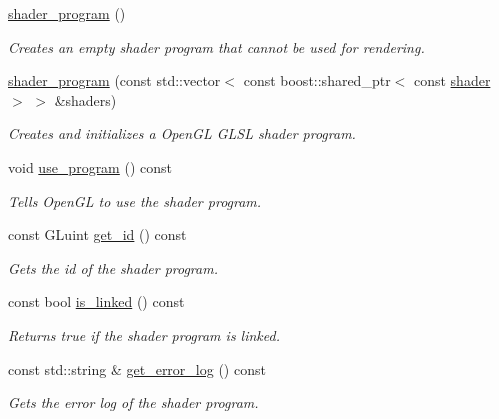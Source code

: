 \begin{DoxyCompactItemize}
\item 
\hyperlink{classoccluded_1_1opengl_1_1retained_1_1shaders_1_1shader__program_a940103083cf5b991c8de690748311dc3}{shader\+\_\+program} ()
\begin{DoxyCompactList}\small\item\em Creates an empty shader program that cannot be used for rendering. \end{DoxyCompactList}\item 
\hyperlink{classoccluded_1_1opengl_1_1retained_1_1shaders_1_1shader__program_ac6459ada0453594a47d1294591d26fc5}{shader\+\_\+program} (const std\+::vector$<$ const boost\+::shared\+\_\+ptr$<$ const \hyperlink{classoccluded_1_1opengl_1_1retained_1_1shaders_1_1shader}{shader} $>$ $>$ \&shaders)
\begin{DoxyCompactList}\small\item\em Creates and initializes a Open\+G\+L G\+L\+S\+L shader program. \end{DoxyCompactList}\item 
void \hyperlink{classoccluded_1_1opengl_1_1retained_1_1shaders_1_1shader__program_a92731484e3b37d25b3dc66a3a1871d2e}{use\+\_\+program} () const 
\begin{DoxyCompactList}\small\item\em Tells Open\+G\+L to use the shader program. \end{DoxyCompactList}\item 
const G\+Luint \hyperlink{classoccluded_1_1opengl_1_1retained_1_1shaders_1_1shader__program_a5824dc0a31ac6e1100cfa0677e309020}{get\+\_\+id} () const 
\begin{DoxyCompactList}\small\item\em Gets the id of the shader program. \end{DoxyCompactList}\item 
const bool \hyperlink{classoccluded_1_1opengl_1_1retained_1_1shaders_1_1shader__program_abe39aa226fb93ad1ad81ff518a40ebb7}{is\+\_\+linked} () const 
\begin{DoxyCompactList}\small\item\em Returns true if the shader program is linked. \end{DoxyCompactList}\item 
const std\+::string \& \hyperlink{classoccluded_1_1opengl_1_1retained_1_1shaders_1_1shader__program_aec76ef71a76e73b398d73b8467ff6bca}{get\+\_\+error\+\_\+log} () const 
\begin{DoxyCompactList}\small\item\em Gets the error log of the shader program. \end{DoxyCompactList}\end{DoxyCompactItemize}


